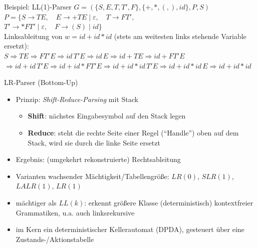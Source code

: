 \begin{frame}{Beispiel: LL(1)-Parser}
	$G=(\{S,E,T,T',F\}, \{+,*,(,),id\}, P, S)$\\
	$P=\{S \rightarrow TE, \quad E \rightarrow {+}TE \mid \varepsilon, \quad T \rightarrow FT',$\\
	\qquad$T' \rightarrow {*}FT' \mid \varepsilon, \quad F \rightarrow (S) \mid id\}$\\[0.5em]
	Linksableitung von $w=id+id*id$ (stets am weitesten links stehende Variable ersetzt):\\
	\footnotesize
	$S \Rightarrow TE \Rightarrow FT'E \Rightarrow id\,T'E \Rightarrow id\,E \Rightarrow id{+}TE \Rightarrow id{+}FT'E$\\
	$\Rightarrow id{+}id\,T'E \Rightarrow id{+}id{*}FT'E \Rightarrow id{+}id{*}id\,T'E \Rightarrow id{+}id{*}id\,E \Rightarrow id{+}id{*}id$
\end{frame}

\begin{frame}{LR-Parser (Bottom-Up)}
	\begin{itemize}
		\item Prinzip: \emph{Shift-Reduce-Parsing} mit Stack
		\begin{itemize}
			\item \textbf{Shift}: nächstes Eingabesymbol auf den Stack legen
			\item \textbf{Reduce}: steht die rechte Seite einer Regel ("`Handle"') oben auf dem Stack, wird sie durch die linke Seite ersetzt
		\end{itemize}
		\item Ergebnis: (umgekehrt rekonstruierte) Rechtsableitung
		\item Varianten wachsender Mächtigkeit/Tabellengröße: $LR(0)$, $SLR(1)$, $LALR(1)$, $LR(1)$
		\item mächtiger als $LL(k)$: erkennt größere Klasse (deterministisch) kontextfreier Grammatiken, u.a. auch linksrekursive
		\item im Kern ein deterministischer Kellerautomat (DPDA), gesteuert über eine Zustands-/Aktionstabelle
	\end{itemize}
\end{frame}

